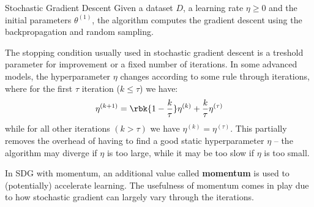 \documentclass[a4paper, 12pt]{report}
\begin{document}
    \begin{framedalgo}{Stochastic Gradient Descent}
        Given a dataset $D$, a learning rate $\eta \geq 0$ and the initial parameters $\theta^{(1)}$, the algorithm computes the gradient descent using the backpropagation and random sampling.

        \begin{algorithmic}
                \EndWhile
            \EndFunction
        \end{algorithmic}
    \end{framedalgo}

    The stopping condition usually used in stochastic gradient descent is a treshold parameter for improvement or a fixed number of iterations. In some advanced models, the hyperparameter $\eta$ changes according to some rule through iterations, where for the first $\tau$ iteration ($k \leq \tau$) we have:
    \[\eta^{(k+1)} = \rbk{1- \frac{k}{\tau}} \eta^{(k)} + \frac{k}{\tau} \eta^{(\tau)}\]
    while for all other iterations $(k > \tau)$ we have $\eta^{(k)} = \eta^{(\tau)}$. This partially removes the overhead of having to find a good static hyperparameter $\eta$ -- the algorithm may diverge if $\eta$ is too large, while it may be too slow if $\eta$ is too small. 

    In SDG with momentum, an additional value called \textbf{momentum} is used to (potentially) accelerate learning. The usefulness of momentum comes in play due to how stochastic gradient can largely vary through the iterations.
\end{document}
